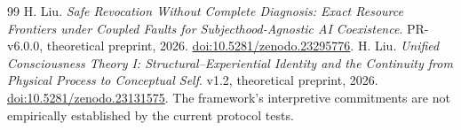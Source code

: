 \begin{thebibliography}{99}
 H. Liu. \emph{Safe Revocation Without Complete Diagnosis: Exact Resource Frontiers under Coupled Faults for Subjecthood-Agnostic AI Coexistence}. PR-v6.0.0, theoretical preprint, 2026. \href{https://doi.org/10.5281/zenodo.23295776}{doi:10.5281/zenodo.23295776}.
 H. Liu. \emph{Unified Consciousness Theory I: Structural--Experiential Identity and the Continuity from Physical Process to Conceptual Self}. v1.2, theoretical preprint, 2026. \href{https://doi.org/10.5281/zenodo.23131575}{doi:10.5281/zenodo.23131575}. The framework's interpretive commitments are not empirically established by the current protocol tests.
\end{thebibliography}

